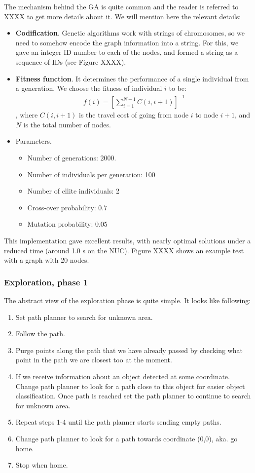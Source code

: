 The mechanism behind the GA is quite common and the reader is referred to XXXX to get more details about it. We will mention here the relevant details:
\begin{itemize}
\item \textbf{Codification}. Genetic algorithms work with strings of chromosomes, so we need to somehow encode the graph information into a string. For this, we gave an integer ID number to each of the nodes, and formed a string as a sequence of IDs (see Figure XXXX).
\item \textbf{Fitness function}. It determines the performance of a single individual from a generation. We choose the fitness of individual $i$ to be:
\begin{align}
f(i) = \left[\sum_{i = 1}^{N-1} C(i,i+1)\right]^{-1}
\end{align}
, where $C(i, i+1)$ is the travel cost of going from node $i$ to node $i+1$, and $N$ is the total number of nodes.
\item Parameters. 
\begin{itemize}
\item Number of generations: 2000.
\item Number of individuals per generation: 100
\item Number of ellite individuals: 2
\item Cross-over probability: 0.7
\item Mutation probability: 0.05
\end{itemize}
\end{itemize}

This implementation gave excellent results, with nearly optimal solutions under a reduced time (around 1.0 s on the NUC). Figure XXXX shows an example test with a graph with 20 nodes. 

\subsubsection{Exploration, phase 1}

The abstract view of the exploration phase is quite simple. It looks like following:

\begin{enumerate}
\item Set path planner to search for unknown area.
\item Follow the path.
\item Purge points along the path that we have already passed by checking what point in the path we are closest too at the moment.
\item If we receive information about an object detected at some coordinate. Change path planner to look for a path close to this object for easier object classification. Once path is reached set the path planner to continue to search for unknown area.
\item Repeat steps 1-4 until the path planner starts sending empty paths. 
\item Change path planner to look for a path towards coordinate (0,0), aka. go home.
\item Stop when home.
\end{enumerate}

